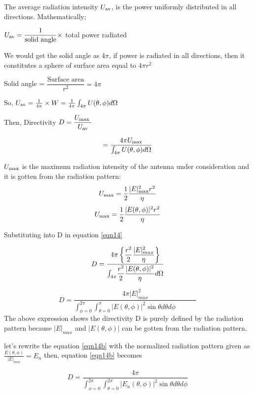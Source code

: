\begin{enumerate}
The average radiation intensity $U_{\textnormal{av}}$, is the power uniformly distributed in all directions. Mathematically;

$U_{\textnormal{av}}=\dfrac{1}{\textnormal{solid angle}} \times$ total power radiated

We would get the solid angle as 4$\pi$, if power is radiated in all directions, then it constitutes a sphere of surface area equal to $4\pi r^{2}$

Solid angle = $\dfrac{\text{Surface area}}{r^{2}} = 4\pi$

So, $U_{\textnormal{av}}=\frac{1}{4\pi} \times W = \frac{1}{4\pi}\int_{4\pi}U(\theta ,\phi)d\Omega$

Then, Directivity $D=\dfrac{U_{\textnormal{max
}}}{U_{\textnormal{av}}}$ 

\begin{equation}
= \frac{4\pi U_{\textnormal{max}}}{\int_{4\pi}U(\theta,\phi)d\Omega}
\label{eqn14}
\end{equation}

$U_{\textnormal{max}}$ is the maximum radiation intensity of the antenna under consideration and it is gotten from the radiation pattern:
$$U_{\textnormal{max}}=\frac{1}{2}\frac{|E|^{2}_{\textnormal{max}}r^{2}}{\eta}$$
$$U_{\textnormal{max}}=\frac{1}{2}\frac{|E(\theta,\phi)|^{2}r^{2}}{\eta}$$

Substituting into D in equation \ref{eqn14}

$$
D = \dfrac{4\pi\left\{\dfrac{r^2}{2}
	\dfrac{|E|^2_{max}}{\eta}\right\}}
{{\Large \int_{4\pi}}\dfrac{r^2}{2}
	\dfrac{|E(\theta,\phi)|^2}{\eta}d\Omega }
$$

\begin{equation}
D = \dfrac{4\pi|E|^2_{max}}{\int^{ 2\pi}_{\phi=0}\int^{ \pi}_{\theta=0}|E(\theta,\phi)|^2\sin\theta d\theta d\phi \qquad \quad}
\label{eqn14b}
\end{equation}
The above expression shows the directivity D is purely defined by the radiation pattern because $|E|_{max}$ and $|E(\theta, \phi)|$ can be gotten from the radiation pattern.

let's rewrite the equation \ref{eqn14b} with the normalized radiation pattern given as $\frac{E(\theta, \phi)}{|E|_{max}} = E_n$ then, equation \ref{eqn14b} becomes

\begin{equation}
D = \frac{4\pi}{\int_{\phi = 0}^{2\pi}\int_{\theta = 0}^{2\pi}|E_n(\theta, \phi)|^2\sin\theta d\theta d\phi}
\label{eqn14c}
\end{equation}


\end{enumerate}
